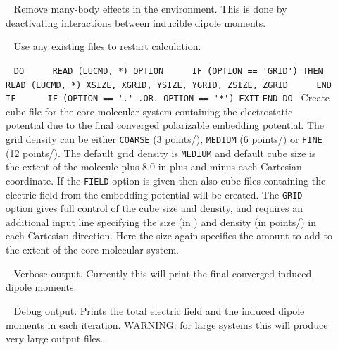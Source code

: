 \begin{description}
\item[]\verb| |\newline
Remove many-body effects in the environment. This is done by deactivating interactions between inducible dipole moments. 

\item[]\verb| |\newline
Use any existing files to restart calculation.

\item[]\verb| |\newline
\verb|DO|\verb| |\newline
\verb|    READ (LUCMD, *) OPTION|\verb| |\newline
\verb|    IF (OPTION == 'GRID') THEN|\verb| |\newline
\verb|       READ (LUCMD, *) XSIZE, XGRID, YSIZE, YGRID, ZSIZE, ZGRID|\verb| |\newline
\verb|    END IF| \verb| |\newline
\verb|    IF (OPTION == '.' .OR. OPTION == '*') EXIT| \newline
\verb|END DO|\verb| |\newline
Create cube file for the core molecular system containing the
electrostatic potential due to the final converged polarizable
embedding potential. The grid density can be either \verb|COARSE| (3
points/\bohr{}), \verb|MEDIUM| (6 points/\bohr{}) or \verb|FINE| (12
points/\bohr{}). The default grid density is \verb|MEDIUM| and default
cube size is the extent of the molecule plus 8.0 \bohr{} in plus and
minus each Cartesian coordinate. If the \verb|FIELD| option is given
then also cube files containing the electric field from the embedding
potential will be created. The \verb|GRID| option gives full control
of the cube size and density, and requires an additional input line
specifying the size (in \bohr{}) and density (in points/\bohr{}) in each
Cartesian direction. Here the size again specifies the amount to add
to the extent of the core molecular system.

\item[]\verb| |\newline
Verbose output. Currently this will print the final converged induced dipole moments.

\item[]\verb| |\newline
Debug output. Prints the total electric field and the induced dipole moments in each iteration. WARNING: for large systems this will produce very large output files.

\end{description}

